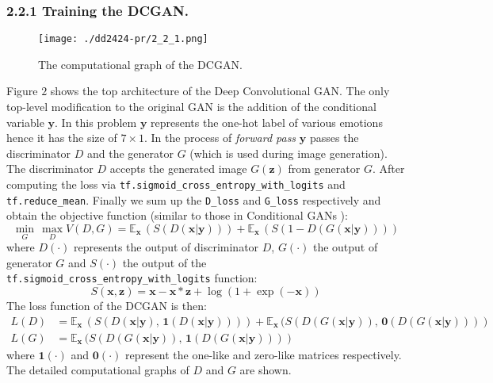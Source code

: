 \documentclass[runningheads]{llncs}
\begin{document}
\subsubsection*{2.2.1 Training the DCGAN.\ }
\begin{figure}
\begin{center}
\texttt{[image: ./dd2424-pr/2\_2\_1.png]}
\caption{The computational graph of the DCGAN.}
\end{center}
\end{figure}
Figure $2$ shows the top architecture of the Deep Convolutional GAN. The only top-level modification to the original GAN is the addition of the conditional variable $\textbf{y}$. In this problem $\textbf{y}$ represents the one-hot label of various emotions hence it has the size of $7\times1$. In the process of \textit{forward pass} $\textbf{y}$ passes the discriminator $D$ and the generator $G$ (which is used during image generation). The discriminator $D$ accepts the generated image $G(\textbf{z})$ from generator $G$. After computing the loss via \texttt{tf.sigmoid\_cross\_entropy\_with\_logits} and \texttt{tf.reduce\_mean}. Finally we sum up the \texttt{D\_loss} and \texttt{G\_loss} respectively and obtain the objective function (similar to those in Conditional GANs \cite{mirza_osindero_2014}):
\begin{equation}
\min\limits_{G}\,\max\limits_{D}V(D,G)=\mathbb{E}_{\textbf{x}}\,(S(D(\textbf{x}|\textbf{y})))+\mathbb{E}_{\textbf{x}}\,(S(1-D(G(\textbf{x}|\textbf{y}))))
\end{equation}
where $D(\cdot)$ represents the output of discriminator $D$, $G(\cdot)$ the output of generator $G$ and $S(\cdot)$ the output of the \texttt{tf.sigmoid\_cross\_entropy\_with\_logits} function:
\begin{equation}
S(\mathbf{x},\mathbf{z})=\mathbf{x}-\mathbf{x}*\mathbf{z}+\log(1+\exp(-\mathbf{x}))
\end{equation}
The loss function of the DCGAN is then:
\begin{align}
L(D)&=\mathbb{E}_{\textbf{x}}\,(S(D(\textbf{x}|\textbf{y}),\,\mathbf{1}(D(\textbf{x}|\textbf{y}))))+\mathbb{E}_{\textbf{x}}\,(S(D(G(\textbf{x}|\textbf{y})),\,\mathbf{0}(D(G(\textbf{x}|\textbf{y}))))\\
L(G)&=\mathbb{E}_{\textbf{x}}\,(S(D(G(\textbf{x}|\textbf{y})),\,\mathbf{1}(D(G(\textbf{x}|\textbf{y}))))
\end{align}
where $\mathbf{1}(\cdot)$ and $\mathbf{0}(\cdot)$ represent the one-like and zero-like matrices respectively. The detailed computational graphs of $D$ and $G$ are shown.
\end{document}
